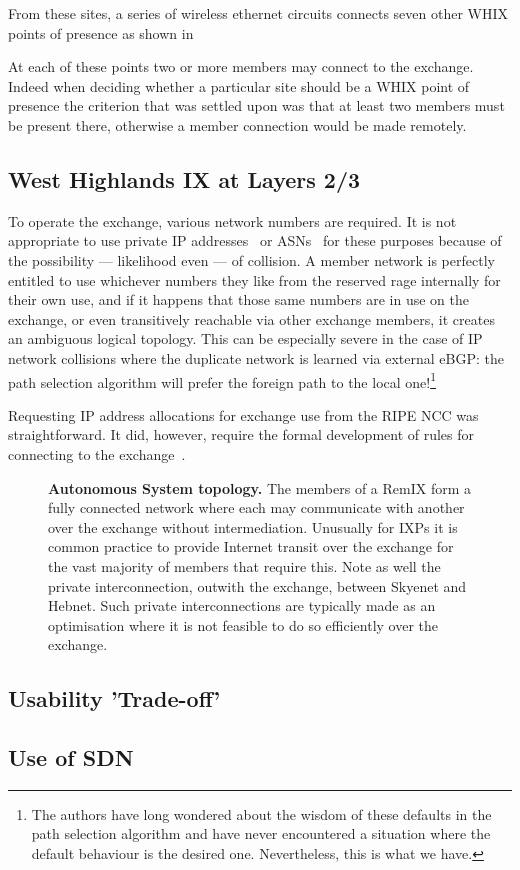 From these sites, a series of wireless ethernet circuits connects
seven other \ac{WHIX} points of presence as shown in



At each of these points two or more members may connect to the
exchange. Indeed when deciding whether a particular site should be
a \ac{WHIX} point of presence the criterion that was settled upon was
that at least two members must be present there, otherwise a member
connection would be made remotely.




\subsection{West Highlands IX at Layers 2/3}

To operate the exchange, various network numbers are required. It is
not appropriate to use private IP addresses~\cite{rfc1918}
or \acp{ASN}~\cite{rfc6996} for these purposes because of the
possibility --- likelihood even --- of collision. A member network is
perfectly entitled to use whichever numbers they like from the
reserved rage internally for their own use, and if it happens that
those same numbers are in use on the exchange, or even transitively
reachable via other exchange members, it creates an ambiguous logical
topology. This can be especially severe in the case of IP network
collisions where the duplicate network is learned via external eBGP:
the path selection algorithm will prefer the foreign path to the local
one!\footnote{The authors have long wondered about the wisdom of these
defaults in the path selection algorithm and have never encountered a
situation where the default behaviour is the desired
one. Nevertheless, this is what we have.}

Requesting IP address allocations for exchange use from the RIPE NCC
was straightforward. It did, however, require the formal development
of rules for connecting to the exchange~\cite{whixrules}.


\begin{figure}[h]
  \resizebox{\linewidth}{!}{
    \begin{tikzpicture}
      \whixtopodiagram
    \end{tikzpicture}
  }
  \caption{
  \textbf{Autonomous System topology.} The members of a RemIX form a fully connected network where each may communicate
  with another over the exchange without intermediation. Unusually for \acp{IXP} it is common practice to provide Internet transit over the exchange for the vast majority of members that require this. Note as
  well the private interconnection, outwith the exchange, between Skyenet
  and Hebnet. Such private interconnections are typically made as
  an optimisation where it is not feasible to do so efficiently over the exchange.
  }
\end{figure}



\subsection{Usability 'Trade-off'} \label{subsec:use}


\subsection{Use of SDN}
